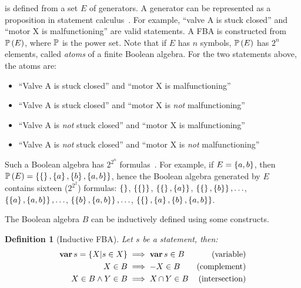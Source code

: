 \documentclass[12pt,openright,twoside,a4paper,oldfontcommands,english,brazil,draft]{abntex2}
\newtheorem{Def}{Definition}[chapter]
\theoremstyle{theo}
\def\varop{\ensuremath\operatorname{\mathbf{var}}}
\newcommand{\var}[1]{\ensuremath\varop #1}
\newcommand{\setsin}[1]{\ensuremath\left\{ #1 \right\}}
\def\inter{\ensuremath\operatorname{\cap}}
\def\powersetop{\ensuremath\mathbb{P}}
\newcommand{\powerset}[1]{\ensuremath\powersetop\left(#1\right)}
\begin{document}
\begin{sloppypar}
 is defined from a set $E$ of generators.
A generator can be represented as a proposition in statement calculus~\cite[p. 274]{Stoll1979}.
For example, ``valve A is stuck closed'' and ``motor X is malfunctioning'' are valid statements.
A \acl{FBA} is constructed from $\powerset{E}$, where $\powersetop$ is the power set.
Note that if $E$ has $n$ symbols, $\powerset{E}$ has $2^{n}$ elements, called \emph{atoms} of a finite Boolean algebra.
For the two statements above, the atoms are:
\begin{itemize}
  \item ``Valve A is stuck closed'' and ``motor X is malfunctioning''
  \item ``Valve A is stuck closed'' and ``motor X is \emph{not} malfunctioning''
  \item ``Valve A is \emph{not} stuck closed'' and ``motor X is malfunctioning''
  \item ``Valve A is \emph{not} stuck closed'' and ``motor X is \emph{not} malfunctioning''
\end{itemize}
Such a Boolean algebra has $2^{2^{n}}$ formulas~\cite[p. 261]{GH2009}.
For example, if $E = \setsin{a,b}$, then $\powerset{E} = \setsin{ \setsin{}, \setsin{a}, \setsin{b}, \setsin{a,b} }$, hence the Boolean algebra generated by $E$ contains sixteen ($2^{2^{2}}$) formulas:
$\setsin{}$,
$\setsin{\setsin{}}$,
$\setsin{\setsin{}, \setsin{a}}$,
$\setsin{\setsin{}, \setsin{b}}, \ldots$,
$\setsin{\setsin{a}, \setsin{a,b}}, \ldots$,
$\setsin{\setsin{b}, \setsin{a,b}}, \ldots$,
$\setsin{\setsin{}, \setsin{a}, \setsin{b}, \setsin{a,b}}$.
\end{sloppypar}

The Boolean algebra $B$ can be inductively defined using some constructs.
%
\begin{Def}[Inductive \acl{FBA}]
\label{def:inductive-fba}
Let $s$ be a statement, then:
%
\begin{subequations}
\begin{align}
\var s = \setsin{X | s \in X} & \implies \var s \in B & \text{(variable)}\\
X \in B & \implies -X \in B                           & \text{(complement)}\\
X \in B \land Y \in B & \implies X \inter Y \in B     & \text{(intersection)}
\end{align}
\end{subequations}
%
\end{Def}
\end{document}
